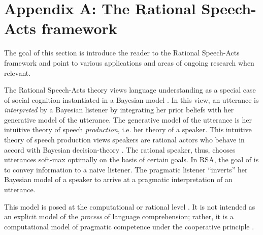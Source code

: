 \documentclass[12pt,letterpaper]{article}
\begin{document}
\newpage


\setlength{\bibleftmargin}{.125in}
\setlength{\bibindent}{-\bibleftmargin}



\newpage


\section*{Appendix A: The Rational Speech-Acts framework}

The goal of this section is introduce the reader to the Rational Speech-Acts framework and point to various applications and areas of ongoing research when relevant.

The Rational Speech-Acts theory views language understanding as a special case of social cognition instantiated in a Bayesian model \cite{Frank2012, Goodman2013}. 
In this view, an utterance is \emph{interpreted} by a Bayesian listener by integrating her prior beliefs with her generative model of the utterance.
The generative model of the utterance is her intuitive theory of speech \emph{production}, i.e. her theory of a speaker. 
This intuitive theory of speech production views speakers are rational actors who behave in accord with Bayesian decision-theory \cite{berger1988}.
The rational speaker, thus, chooses utterances soft-max optimally on the basis of certain goals.
In RSA, the goal of is to convey information to a naive listener. 
The pragmatic listener ``inverts'' her Bayesian model of a speaker to arrive at a pragmatic interpretation of an utterance.

This model is posed at the computational or rational level \cite{Marr1980, Anderson1991}. 
It is not intended as an explicit model of the \emph{process} of language comprehension; rather, it is a computational model of pragmatic competence under the cooperative principle \cite{Grice1975}. 
\end{document}
